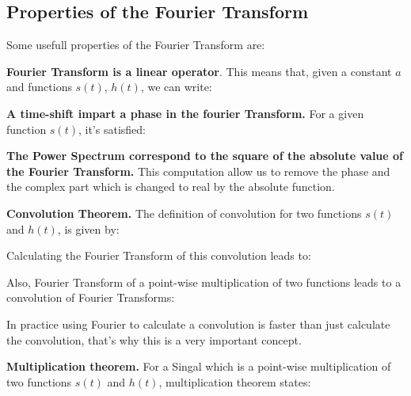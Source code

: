 \subsection{Properties of the Fourier Transform}{\label{subsec_propft}}
\newp Some usefull properties of the Fourier Transform are:
	\begin{description}
	
	\item \textbf{Fourier Transform is a linear operator}. This means that, given a constant $a$ and 		functions $s(t)$, $h(t)$, we can write:
	\insertequation[\label{linear1}]{\FF[s(t) + h(t)] =  \FF[s(t)] + \FF[h(t)]} 
	\insertequation[\label{linear2}]{\FF[as(t)] = a\FF[s(t)] }

	\item \textbf{A time-shift impart a phase in the fourier Transform.} For a given function $s(t)$, it's satisfied:

	\item \textbf{The Power Spectrum correspond to the square of the absolute value of the Fourier Transform.} This computation allow us to remove the phase and the complex part which is changed to real by the absolute function.
	
	
	\item \textbf{Convolution Theorem.} The definition of convolution for two functions $s(t)$ and $h(t)$, is given by:
	
	
	Calculating the Fourier Transform of this convolution leads to:
	
	\insertequation[\label{convolution2}]{\FF[s * h] = \FF[s] \cdotp \FF[h]}
	
	Also, Fourier Transform of a point-wise multiplication of two functions leads to a convolution of Fourier Transforms:
	
	\insertequation[\label{convolution3}]{\FF[s \cdotp h)] = \FF[s] * \FF[h]}
	
	In practice using Fourier to calculate a convolution is faster than just calculate the convolution, that's why this is a very important concept.
	
	\item \textbf{Multiplication theorem.} For a Singal which is a point-wise multiplication of two functions $s(t)$ and $h(t)$, multiplication theorem states:
	

\end{description}
